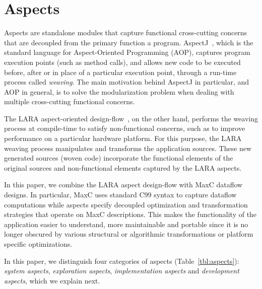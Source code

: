 \section{Aspects}

Aspects are standalone modules that capture functional cross-cutting concerns
that are decoupled from the primary function a program. AspectJ~\cite{Kiczales:2001}, which is the standard language for Aspect-Oriented Programming (AOP),  captures program execution points (such as method calls), and allows new code to be executed before, after or in place of a particular execution point, through a run-time process called \emph{weaving}. The main motivation behind AspectJ in particular, and AOP in general, is to solve the modularization problem when dealing with multiple cross-cutting functional concerns.

The LARA aspect-oriented design-flow~\cite{Cardoso:Carvalho:Coutinho:Luk:Nobre:Diniz:Petrov:2012}, on the other hand, performs the weaving process at compile-time to satisfy non-functional concerns, such as to improve performance on a particular hardware platform. For this purpose, the LARA weaving process manipulates and transforms the application sources. These new generated sources (woven code) incorporate the functional elements of the original sources and non-functional elements captured by the LARA aspects.

In this paper, we combine the LARA aspect design-flow with MaxC dataflow designs. In particular, MaxC uses standard C99 syntax to capture dataflow computations while aspects specify decoupled optimization and transformation strategies that operate on MaxC descriptions. This makes the
functionality of the application easier to understand, more
maintainable and portable since it is no longer obscured by various
structural or algorithmic transformations or platform specific
optimizations.

In this paper, we distinguish four categories of aspects (Table~\ref{tbl:aspects}): \emph{system aspects}, \emph{exploration aspects}, \emph{implementation aspects} and
\emph{development aspects}, which we explain next.



